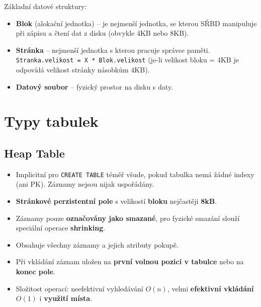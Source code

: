 Základní datové struktury:
\begin{itemize}
  \item \textbf{Blok} (alokační jednotka) -- je nejmenší jednotka, se kterou SŘBD manipuluje při zápisu a čtení dat z disku (obvykle 4KB nebo 8KB).
  \item \textbf{Stránka} -- nejmenší jednotka s kterou pracuje správce paměti. \texttt{Stranka.velikost = X * Blok.velikost} (je-li velikost bloku = 4KB je odpovídá velikost stránky násobkům 4KB).
  \item \textbf{Datový soubor} -- fyzický prostor na disku s daty.
\end{itemize}


\section{Typy tabulek}
\subsection{Heap Table}
\begin{itemize}
  \item Implicitní pro \texttt{CREATE TABLE} téměř všude, pokud tabulka nemá žádné indexy (ani PK). Záznamy nejsou nijak uspořádány.
  \item \textbf{Stránkové perzistentní pole} s velikostí \textbf{bloku} nejčastěji \textbf{8kB}.
  \item Záznamy pouze \textbf{označovány jako smazané}, pro fyzické smazání slouží speciální operace \textbf{shrinking}.
  \item Obsahuje všechny záznamy a jejich atributy pokupě.
  \item Při vkládání záznam uložen na \textbf{první volnou pozici v tabulce} nebo na \textbf{konec pole}.
  \item Složitost operací: neefektivní vyhledávání $O(n)$, velmi \textbf{efektivní vkládání} $O(1)$ i \textbf{využití místa}.
\end{itemize}
